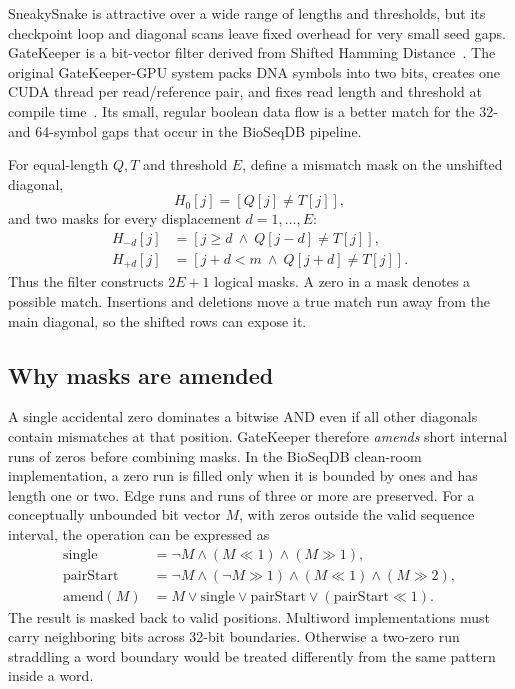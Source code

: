 SneakySnake is attractive over a wide range of lengths and thresholds, but its
checkpoint loop and diagonal scans leave fixed overhead for very small seed
gaps.  GateKeeper is a bit-vector filter derived from Shifted Hamming
Distance~\cite{gatekeeper_paper}.
The original GateKeeper-GPU system packs DNA symbols into two bits, creates one
CUDA thread per read/reference pair, and fixes read length and threshold at
compile time~\cite{gatekeeper_gpu_paper}.  Its small, regular boolean data flow
is a better match for the 32- and 64-symbol gaps that occur in the BioSeqDB
pipeline.

For equal-length \(Q,T\) and threshold \(E\), define a mismatch mask on the
unshifted diagonal,
\[
 H_0[j] = [Q[j]\ne T[j]],
\]
and two masks for every displacement \(d=1,\ldots,E\):
\[
\begin{split}
 H_{-d}[j] &= [j\ge d \ \land\ Q[j-d]\ne T[j]],\\
 H_{+d}[j] &= [j+d<m \ \land\ Q[j+d]\ne T[j]].
\end{split}
\]
Thus the filter constructs \(2E+1\) logical masks.  A zero in a mask denotes a
possible match.  Insertions and deletions move a true match run away from the
main diagonal, so the shifted rows can expose it.

\subsection{Why masks are amended}

A single accidental zero dominates a bitwise AND even if all other diagonals
contain mismatches at that position.  GateKeeper therefore \emph{amends}
short internal runs of zeros before combining masks.  In the BioSeqDB
clean-room implementation, a zero run is filled only when it is bounded by
ones and has length one or two.  Edge runs and runs of three or more are
preserved.  For a conceptually unbounded bit vector \(M\), with zeros outside
the valid sequence interval, the operation can be expressed as
\[
\begin{split}
\mathrm{single} &=
   \neg M \land (M\ll1) \land (M\gg1),\\
\mathrm{pairStart} &=
   \neg M \land (\neg M\gg1) \land (M\ll1) \land (M\gg2),\\
\mathrm{amend}(M) &=
   M \lor \mathrm{single} \lor \mathrm{pairStart}
      \lor (\mathrm{pairStart}\ll1).
\end{split}
\]
The result is masked back to valid positions.  Multiword implementations must
carry neighboring bits across 32-bit boundaries.  Otherwise a two-zero run
straddling a word boundary would be treated differently from the same pattern
inside a word.

